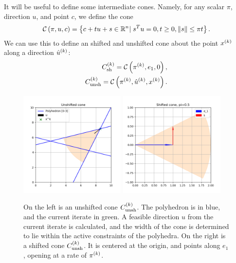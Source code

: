 % 

It will be useful to define some intermediate cones.
Namely, for any scalar $\pi$, direction $u$, and point $c$, we define the cone
\begin{align}
\mathcal C\left(\pi, u, c\right) = \left\{c + t u + s \in \mathbb R^n | \; s^Tu= 0, t \ge 0, \|s\| \le \pi t\right\}.
\end{align}
We can use this to define an shifted and unshifted cone about the point $x^{(k)}$ along a direction ${{{\hat u}^{(k)}}}$:
\begin{align}
{C^{(k)}_{\textrm{sh}}} = \mathcal C\left(\pi^{(k)}, e_1, 0\right), \label{defineshiftedcone} \\
{C^{(k)}_{\textrm{unsh}}} = \mathcal C\left(\pi^{(k)}, {{{\hat u}^{(k)}}}, x^{(k)}\right). \label{defineunshiftedcone}
\end{align}


\begin{figure}[ht]
    \centering
    \includegraphics[width=200px]{images/unshifted_cone.png}
    \includegraphics[width=200px]{images/shifted_cone.png}
    \caption[An example of the shifted and unshifted cones]
	{
		On the left is an unshifted cone ${C^{(k)}_{\textrm{unsh}}}$.
		The polyhedron is in blue, and the current iterate in green.
		A feasible direction $u$ from the current iterate is calculated, and the width of the cone is determined to lie within the active constraints of the polyhedra.
		On the right is a shifted cone ${C^{(k)}_{\textrm{unsh}}}$.
		It is centered at the origin, and points along $e_1$, opening at a rate of $\pi^{(k)}$.
    }
    \label{linear_cones_images}
\end{figure}

